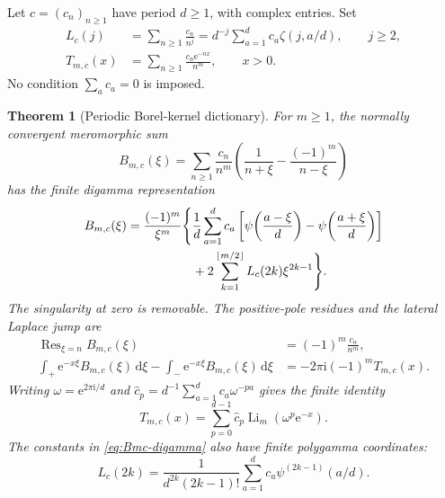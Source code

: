 \documentclass[11pt,a4paper]{article}
\newtheorem{theorem}{Theorem}[section]
\theoremstyle{definition}\newtheorem{definition}[theorem]{Definition}
\theoremstyle{remark}\newtheorem{remark}[theorem]{Remark}
\newcommand{\Li}{\operatorname{Li}}
\newcommand{\Res}{\operatorname{Res}}
\newcommand{\dd}{\,\mathrm d}
\newcommand{\ii}{\mathrm i}
\newcommand{\ee}{\mathrm e}
\numberwithin{equation}{section}
\begin{document}
Let $c=(c_n)_{n\ge1}$ have period $d\ge1$, with complex entries. Set
\begin{align}
 L_c(j)&=\sum_{n\ge1}\frac{c_n}{n^j}
       =d^{-j}\sum_{a=1}^dc_a\zeta(j,a/d),\qquad j\ge2,
                                                  \label{eq:Lc}\\
 T_{m,c}(x)&=\sum_{n\ge1}\frac{c_n\ee^{-nx}}{n^m},\qquad x>0.
                                                  \label{eq:Tmc}
\end{align}
No condition $\sum_ac_a=0$ is imposed.

\begin{theorem}[Periodic Borel-kernel dictionary]\label{thm:periodic}
For $m\ge1$, the normally convergent meromorphic sum
\begin{equation}\label{eq:Bmc-def}
 B_{m,c}(\xi)=\sum_{n\ge1}\frac{c_n}{n^m}
         \left(\frac1{n+\xi}-\frac{(-1)^m}{n-\xi}\right)
\end{equation}
has the finite digamma representation
\begin{align}\label{eq:Bmc-digamma}
 B_{m,c}(\xi)=\frac{(-1)^m}{\xi^m}\Bigg\{
 &\frac1d\sum_{a=1}^dc_a
    \left[\psi\!\left(\frac{a-\xi}{d}\right)
          -\psi\!\left(\frac{a+\xi}{d}\right)\right]\notag\\
 &+2\sum_{k=1}^{\lfloor m/2\rfloor}L_c(2k)\xi^{2k-1}\Bigg\}.
\end{align}
The singularity at zero is removable. The positive-pole residues and the
lateral Laplace jump are
\begin{align}
 \Res_{\xi=n}B_{m,c}(\xi)&=(-1)^m\frac{c_n}{n^m},\label{eq:periodic-res}\\
 \int_+\ee^{-x\xi}B_{m,c}(\xi)\dd\xi
 -\int_-\ee^{-x\xi}B_{m,c}(\xi)\dd\xi
 &=-2\pi\ii(-1)^mT_{m,c}(x).\label{eq:periodic-jump}
\end{align}
Writing $\omega=\ee^{2\pi\ii/d}$ and
$\widehat c_p=d^{-1}\sum_{a=1}^dc_a\omega^{-pa}$ gives the finite identity
\begin{equation}\label{eq:periodic-DFT}
 T_{m,c}(x)=\sum_{p=0}^{d-1}\widehat c_p\Li_m(\omega^p\ee^{-x}).
\end{equation}
The constants in \eqref{eq:Bmc-digamma} also have finite polygamma
coordinates:
\begin{equation}\label{eq:periodic-polygamma}
 L_c(2k)=\frac1{d^{2k}(2k-1)!}
           \sum_{a=1}^dc_a\psi^{(2k-1)}(a/d).
\end{equation}
\end{theorem}
\end{document}
